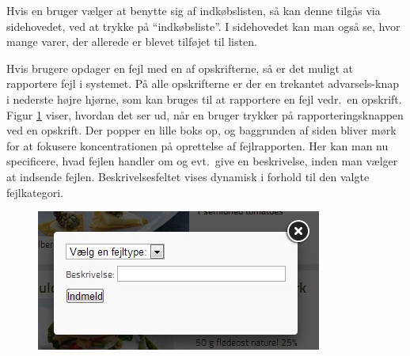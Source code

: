 Hvis en bruger vælger at benytte sig af indkøbslisten, så kan denne tilgås via sidehovedet, ved at trykke på ``indkøbsliste''. I sidehovedet kan man også se, hvor mange varer, der allerede er blevet tilføjet til listen.

Hvis brugere opdager en fejl med en af opskrifterne, så er det muligt at rapportere fejl i systemet. På alle opskrifterne er der en trekantet advarsels-knap i nederste højre hjørne, som kan bruges til at rapportere en fejl vedr.\ en opskrift. Figur \ref{fig:foodl-fejlrapportering} viser, hvordan det ser ud, når en bruger trykker på rapporteringsknappen ved en opskrift. Der popper en lille boks op, og baggrunden af siden bliver mørk for at fokusere koncentrationen på oprettelse af fejlrapporten. Her kan man nu specificere, hvad fejlen handler om og evt.\ give en beskrivelse, inden man vælger at indsende fejlen. Beskrivelsesfeltet vises dynamisk i forhold til den valgte fejlkategori.

\begin{figure}[H]
	\centering
	\includegraphics[scale=0.7]{billeder/foodl/fejlrapportering.jpg}
	\label{fig:foodl-fejlrapportering}
\end{figure}
